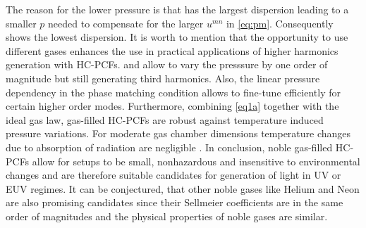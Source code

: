 \documentclass[fleqn, 10pt, twocolumn]{SelfArx}
\begin{document}
    The reason for the lower pressure is that  has the largest dispersion \cite{Borzsonyi2008} leading to a smaller $p$ needed to compensate for the larger $u^{mn}$ in \eqref{eq:pm}.
    Consequently  shows the lowest dispersion.
    It is worth to mention that the opportunity to use different gases enhances the use in practical applications of higher harmonics generation with HC-PCFs. 
     and  allow to vary the presssure by one order of magnitude but still generating third harmonics. Also, the linear pressure dependency in the phase matching condition
    allows to fine-tune efficiently for certain higher order modes.
    Furthermore, combining \eqref{eq1a} together with the ideal gas law, gas-filled HC-PCFs are robust against temperature induced pressure variations. For moderate gas chamber dimensions temperature changes due to absorption of radiation are negligible \cite{Serebryannikov2004}.
    In conclusion, noble gas-filled HC-PCFs allow for setups to be small, nonhazardous and insensitive to environmental changes and are therefore 
    suitable candidates for generation of light in UV or EUV regimes.
    It can be conjectured, that other noble gases like Helium and Neon are also promising candidates since their Sellmeier coefficients are in the same order of magnitudes and the physical properties of noble gases are similar. 

    \printbibliography
\end{document}
